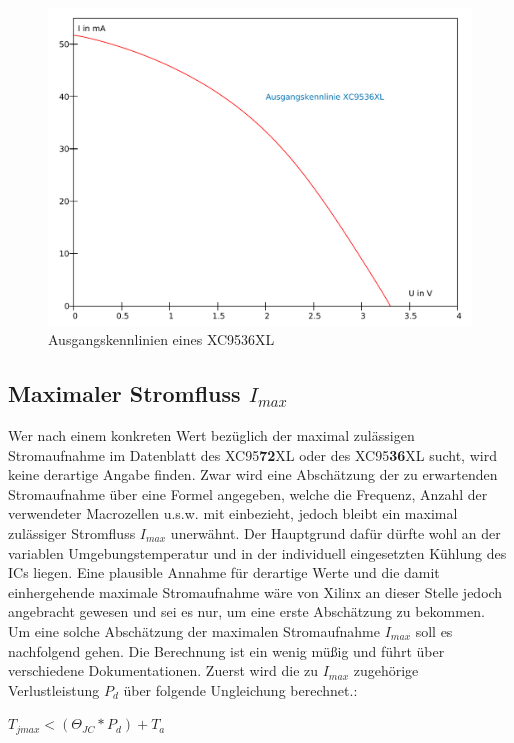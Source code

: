 \documentclass{article}
\begin{document}
\newpage

\begin{figure}[!h]
	\centering
	\includegraphics[width=1\linewidth]{Figures/XC9536_output_characteristics}
	\caption{Ausgangskennlinien eines XC9536XL}
	\label{fig:out_characteristics}
\end{figure}

\subsection{Maximaler Stromfluss $I_{max}$}
\label{sec:max_I}
Wer nach einem konkreten Wert bezüglich der maximal zulässigen Stromaufnahme im Datenblatt \autocite{XC95_Spec} des XC95\textbf{72}XL oder des XC95\textbf{36}XL sucht, wird keine derartige Angabe finden.
Zwar wird eine Abschätzung der zu erwartenden Stromaufnahme über eine Formel angegeben, welche die Frequenz, Anzahl der verwendeter Macrozellen u.s.w. mit einbezieht, jedoch bleibt ein maximal zulässiger Stromfluss $I_{max}$ unerwähnt. Der Hauptgrund dafür dürfte wohl an der variablen Umgebungstemperatur und in der individuell eingesetzten Kühlung des ICs liegen. Eine plausible Annahme für derartige Werte und die damit einhergehende maximale Stromaufnahme wäre von Xilinx an dieser Stelle jedoch angebracht gewesen und sei es nur, um eine erste Abschätzung zu bekommen.\\

Um eine solche Abschätzung der maximalen Stromaufnahme $I_{max}$ soll es nachfolgend gehen. Die Berechnung ist ein wenig müßig und führt über verschiedene Dokumentationen.
Zuerst wird die zu $I_{max}$ zugehörige Verlustleistung $P_d$ über folgende Ungleichung berechnet.\autocite[16]{XC95_maxI}: 
\begin{center}
	$T_{jmax} < (\Theta_{JC}*P_d)+T_a$
\end{center}
\end{document}
